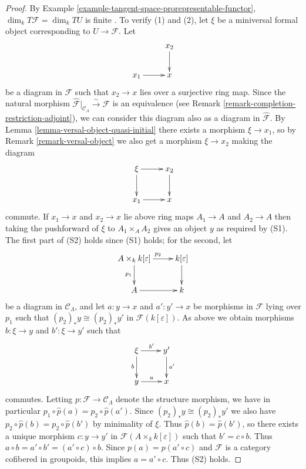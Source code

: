 \begin{proof}
By Example \ref{example-tangent-space-prorepresentable-functor}, $\dim_{k} 
T\mathcal{F} = \dim_{k} TU$ is finite . To verify (1) and (2), let $\xi$ be a 
miniversal formal object corresponding to $U \to \mathcal{F}$. Let 
\[
\xymatrix{
           & x_2 \ar[d] \\
x_1 \ar[r] & x   
}
\]
be a diagram in $\mathcal{F}$ such that $x_2 \to x$ lies over a 
surjective ring map. Since the natural morphism $\widehat{\mathcal 
F}|_{\mathcal{C}_\Lambda} \xrightarrow{\sim} \mathcal{F}$ is an equivalence 
(see Remark \ref{remark-completion-restriction-adjoint}), we can consider this 
diagram also as a diagram in $\widehat{\mathcal{F}}$.  By Lemma 
\ref{lemma-versal-object-quasi-initial} there exists a morphism $\xi 
\to x_1$, so by Remark \ref{remark-versal-object} we also get a 
morphism $\xi \to x_2$ making the diagram
\[
\xymatrix{
\xi \ar[r] \ar[d]          & x_2 \ar[d] \\
x_1 \ar[r] & x   
}
\]
commute.  If $x_1 \to x$ and $x_2 \to x$ lie above ring maps 
$A_1 \to A$ and $A_2 \to A$ then taking the pushforward of 
$\xi$ to $A_1 \times_{A} A_2$ gives an object $y$ as required by (S1). The 
first part of (S2) holds since (S1) holds; for the second, let \[
\xymatrix{
A \times_{k} k[\varepsilon]  \ar[r]^{p_2} \ar[d]_{p_1}  & k[\varepsilon] \ar[d] 
\\
A  \ar[r] & k 
}
\]  
be a diagram in $\mathcal{C}_\Lambda$, and let $a: y \to x$ and $a': 
y' \to x$ be morphisms in $\mathcal{F}$ lying over $p_{1}$ such that 
$(p_2)_{*}y \cong (p_2)_{*}y'$ in $\mathcal{F}(k[\varepsilon])$.  As above we 
obtain morphisms $b: \xi \to y$ and $b': \xi \to y'$ such that
\[
\xymatrix{
\xi \ar[r]^{b'} \ar[d]_{b}          & y' \ar[d]^{a'} \\
y \ar[r]^{a} & x   
}
\]
commutes.  Letting $p: \mathcal{F} \to \mathcal{C}_\Lambda$ denote the 
structure morphism, we have in particular $p_1 \circ \widehat{p}(a) = p_2 \circ 
\widehat{p}(a')$.  Since $(p_2)_{*}y \cong (p_2)_{*}y'$ we also have $p_2 \circ 
\widehat{p}(b) = p_2 \circ \widehat{p}(b')$ by minimality of $\xi$.  Thus 
$\widehat{p}(b) = \widehat{p}(b')$, so there exists a unique morphism $c: y 
\to y'$ in $\mathcal{F}(A \times_{k} k[\varepsilon])$ such that $b' = c 
\circ b$.  Thus $a \circ b = a' \circ b' = (a' \circ c) \circ b$.  Since $p(a) 
= p(a' \circ c)$ and $\mathcal{F}$ is a category cofibered in groupoids, this 
implies $a = a' \circ c$.  Thus (S2) holds.
\end{proof}

